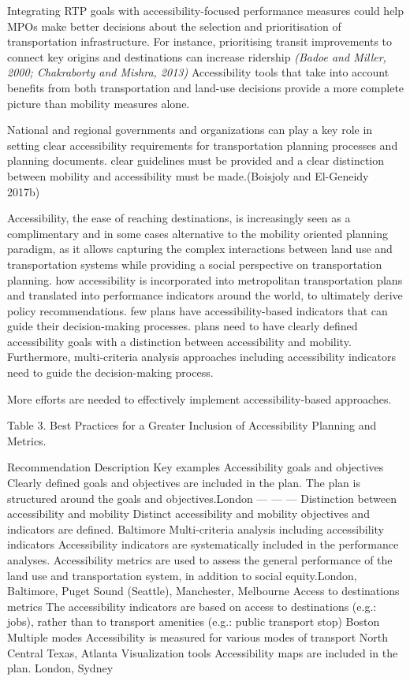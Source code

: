 \documentclass[12pt,]{article}
\begin{document}
Integrating RTP goals with accessibility-focused performance measures
could help MPOs make better decisions about the selection and
prioritisation of transportation infrastructure. For instance,
prioritising transit improvements to connect key origins and
destinations can increase ridership \emph{(Badoe and Miller, 2000;
Chakraborty and Mishra, 2013)} Accessibility tools that take into
account benefits from both transportation and land-use decisions provide
a more complete picture than mobility measures alone.

National and regional governments and organizations can play a key role
in setting clear accessibility requirements for transportation planning
processes and planning documents. clear guidelines must be provided and
a clear distinction between mobility and accessibility must be
made.(Boisjoly and El-Geneidy 2017b)

Accessibility, the ease of reaching destinations, is increasingly seen
as a complimentary and in some cases alternative to the mobility
oriented planning paradigm, as it allows capturing the complex
interactions between land use and transportation systems while providing
a social perspective on transportation planning. how accessibility is
incorporated into metropolitan transportation plans and translated into
performance indicators around the world, to ultimately derive policy
recommendations. few plans have accessibility-based indicators that can
guide their decision-making processes. plans need to have clearly
defined accessibility goals with a distinction between accessibility and
mobility. Furthermore, multi-criteria analysis approaches including
accessibility indicators need to guide the decision-making process.

More efforts are needed to effectively implement accessibility-based
approaches.

Table 3. Best Practices for a Greater Inclusion of Accessibility
Planning and Metrics.

\textbar{}Recommendation \textbar{}Description\textbar{} Key examples
Accessibility goals and objectives \textbar{}Clearly defined goals and
objectives are included in the plan. The plan is structured around the
goals and objectives.\textbar{}London \textbar{} --- \textbar{} ---
\textbar{} --- \textbar{} Distinction between accessibility and mobility
\textbar{}Distinct accessibility and mobility objectives and indicators
are defined. \textbar{}Baltimore \textbar{}Multi-criteria analysis
including accessibility indicators \textbar{}Accessibility indicators
are systematically included in the performance analyses. Accessibility
metrics are used to assess the general performance of the land use and
transportation system, in addition to social equity.\textbar{}London,
Baltimore, Puget Sound (Seattle), Manchester, Melbourne \textbar{}Access
to destinations metrics \textbar{}The accessibility indicators are based
on access to destinations (e.g.: jobs), rather than to transport
amenities (e.g.: public transport stop) \textbar{}Boston
\textbar{}Multiple modes \textbar{}Accessibility is measured for various
modes of transport \textbar{}North Central Texas, Atlanta
\textbar{}Visualization tools \textbar{}Accessibility maps are included
in the plan. \textbar{}London, Sydney
\end{document}
